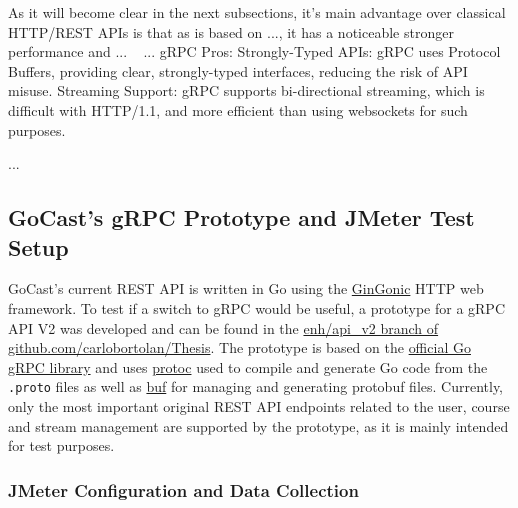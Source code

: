 As it will become clear in the next subsections, it's main advantage over classical HTTP/REST \ac{API}s is that as is based on ..., it has a noticeable stronger performance and ...   
~\parencite{grpc_vs_rest_2}
...
    gRPC Pros:
        Strongly-Typed APIs: gRPC uses Protocol Buffers, providing clear, strongly-typed interfaces, reducing the risk of API misuse.
        Streaming Support: gRPC supports bi-directional streaming, which is difficult with HTTP/1.1, and more efficient than using websockets for such purposes.

... 
~\parencite{grpc_dev}

\subsection{GoCast's gRPC Prototype and JMeter Test Setup}

GoCast's current REST API is written in Go using the \href{https://github.com/gin-gonic/gin}{GinGonic} HTTP web framework. To test if a switch to gRPC would be useful, a prototype for a gRPC \ac{API} V2 was developed and can be found in the \href{https://github.com/carlobortolan/Thesis/tree/enh/api\_v2}{enh/api\_v2 branch of github.com/carlobortolan/Thesis}.
The prototype is based on the \href{https://google.golang.org/grpc}{official Go gRPC library} and uses \href{https://github.com/protocolbuffers/protobuf}{protoc} used to compile and generate Go code from the \texttt{.proto} files as well as \href{https://github.com/bufbuild/buf}{buf} for managing and generating protobuf files. Currently, only the most important original REST \ac{API} endpoints related to the user, course and stream management are supported by the prototype, as it is mainly intended for test purposes.

\subsubsection{JMeter Configuration and Data Collection}

